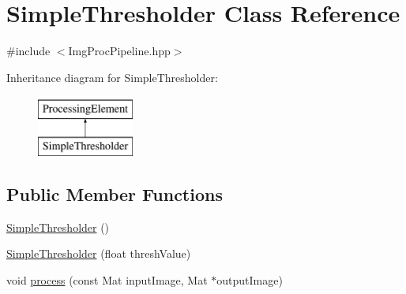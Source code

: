 \hypertarget{classSimpleThresholder}{\section{\-Simple\-Thresholder \-Class \-Reference}
\label{classSimpleThresholder}
}


{\ttfamily \#include $<$\-Img\-Proc\-Pipeline.\-hpp$>$}

\-Inheritance diagram for \-Simple\-Thresholder\-:\begin{figure}[H]
\begin{center}
\leavevmode
\includegraphics[height=2.000000cm]{classSimpleThresholder}
\end{center}
\end{figure}
\subsection*{\-Public \-Member \-Functions}
\begin{DoxyCompactItemize}
\item 
\hyperlink{classSimpleThresholder_ae54e1e58775e9dbbc96a30053d6e9300}{\-Simple\-Thresholder} ()
\item 
\hyperlink{classSimpleThresholder_aaf3200ff1f99d4a8bd221a3c1a370c67}{\-Simple\-Thresholder} (float thresh\-Value)
\item 
void \hyperlink{classSimpleThresholder_a809cb57601f94c3d3d9f8837dfa8dd3b}{process} (const \-Mat input\-Image, \-Mat $\ast$output\-Image)
\end{DoxyCompactItemize}


